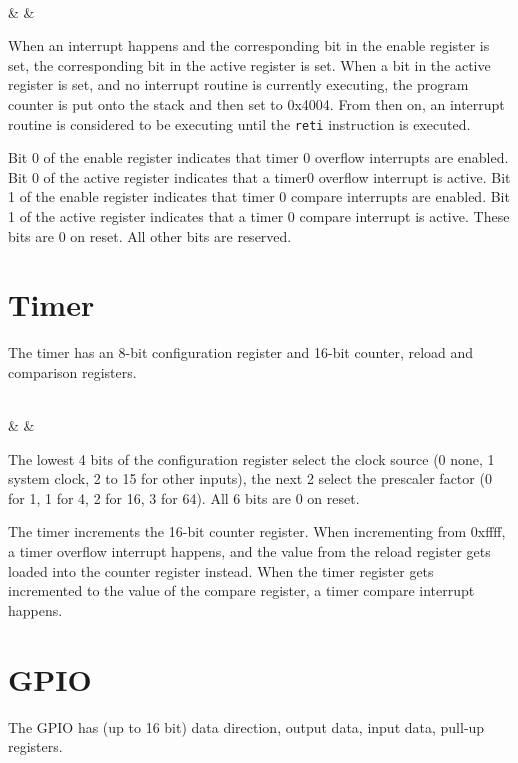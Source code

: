 \documentclass{book}
\begin{document}
\vspace{3mm}
\begin{bytefield}[bitwidth=0.06\linewidth]{8}
	 \\
	 &  & 
\end{bytefield}

When an interrupt happens and the corresponding bit in the enable register is set, the corresponding bit in the active register is set. When a bit in the active register is set, and no interrupt routine is currently executing, the program counter is put onto the stack and then set to 0x4004. From then on, an interrupt routine is considered to be executing until the \texttt{reti} instruction is executed.

Bit 0 of the enable register indicates that timer 0 overflow interrupts are enabled. Bit 0 of the active register indicates that a timer0 overflow interrupt is active. Bit 1 of the enable register indicates that timer 0 compare interrupts are enabled. Bit 1 of the active register indicates that a timer 0 compare interrupt is active. These bits are 0 on reset. All other bits are reserved.

\section{Timer}

The timer has an 8-bit configuration register and 16-bit counter, reload and comparison registers.

\vspace{3mm}
\begin{bytefield}[bitwidth=0.13\linewidth]{8}
	 \\
	 &  & 
\end{bytefield}

The lowest 4 bits of the configuration register select the clock source (0 none, 1 system clock, 2 to 15 for other inputs), the next 2 select the prescaler factor (0 for 1, 1 for 4, 2 for 16, 3 for 64). All 6 bits are 0 on reset.

The timer increments the 16-bit counter register. When incrementing from 0xffff, a timer overflow interrupt happens, and the value from the reload register gets loaded into the counter register instead. When the timer register gets incremented to the value of the compare register, a timer compare interrupt happens.

\section{GPIO}

The GPIO has (up to 16 bit) data direction, output data, input data, pull-up registers.
\end{document}

